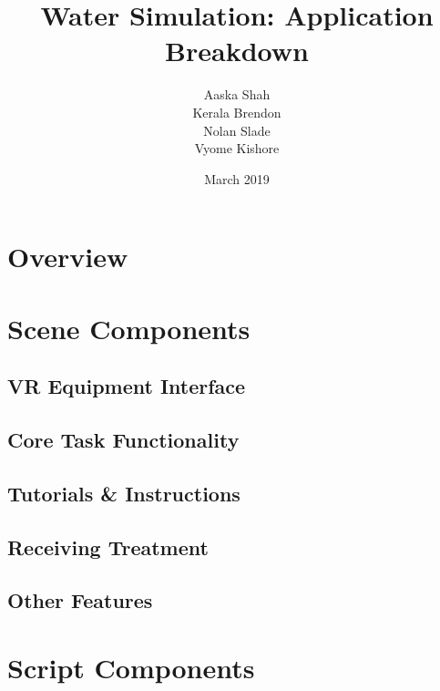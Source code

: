 \documentclass{article}
\title{Water Simulation: Application Breakdown}
\author{Aaska Shah\\Kerala Brendon\\Nolan Slade\\Vyome Kishore}
\date{March 2019}
\begin{document}
\maketitle


\section*{Overview}

\section*{Scene Components}
\subsection*{VR Equipment Interface} %

\subsection*{Core Task Functionality} %

\subsection*{Tutorials \& Instructions} %

\subsection*{Receiving Treatment} %

\subsection*{Other Features} %


\section*{Script Components}
\end{document}
